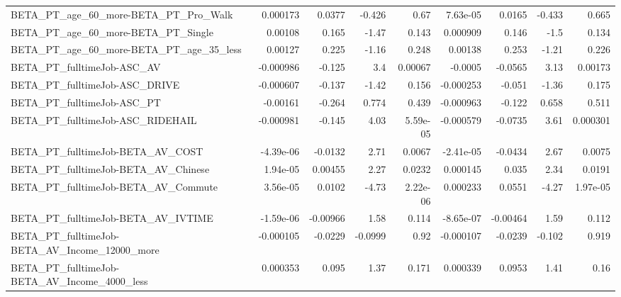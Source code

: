\begin{tabular}{lrrrrrrrr}
BETA\_PT\_age\_60\_more-BETA\_PT\_Pro\_Walk               &    0.000173 &       0.0377 &    -0.426 &     0.67 &   7.63e-05 &      0.0165 &       -0.433 &         0.665 \\
BETA\_PT\_age\_60\_more-BETA\_PT\_Single                 &     0.00108 &        0.165 &     -1.47 &    0.143 &   0.000909 &       0.146 &         -1.5 &         0.134 \\
BETA\_PT\_age\_60\_more-BETA\_PT\_age\_35\_less            &     0.00127 &        0.225 &     -1.16 &    0.248 &    0.00138 &       0.253 &        -1.21 &         0.226 \\
BETA\_PT\_fulltimeJob-ASC\_AV                         &   -0.000986 &       -0.125 &       3.4 &  0.00067 &    -0.0005 &     -0.0565 &         3.13 &       0.00173 \\
BETA\_PT\_fulltimeJob-ASC\_DRIVE                      &   -0.000607 &       -0.137 &     -1.42 &    0.156 &  -0.000253 &      -0.051 &        -1.36 &         0.175 \\
BETA\_PT\_fulltimeJob-ASC\_PT                         &    -0.00161 &       -0.264 &     0.774 &    0.439 &  -0.000963 &      -0.122 &        0.658 &         0.511 \\
BETA\_PT\_fulltimeJob-ASC\_RIDEHAIL                   &   -0.000981 &       -0.145 &      4.03 & 5.59e-05 &  -0.000579 &     -0.0735 &         3.61 &      0.000301 \\
BETA\_PT\_fulltimeJob-BETA\_AV\_COST                   &   -4.39e-06 &      -0.0132 &      2.71 &   0.0067 &  -2.41e-05 &     -0.0434 &         2.67 &        0.0075 \\
BETA\_PT\_fulltimeJob-BETA\_AV\_Chinese                &    1.94e-05 &      0.00455 &      2.27 &   0.0232 &   0.000145 &       0.035 &         2.34 &        0.0191 \\
BETA\_PT\_fulltimeJob-BETA\_AV\_Commute                &    3.56e-05 &       0.0102 &     -4.73 & 2.22e-06 &   0.000233 &      0.0551 &        -4.27 &      1.97e-05 \\
BETA\_PT\_fulltimeJob-BETA\_AV\_IVTIME                 &   -1.59e-06 &     -0.00966 &      1.58 &    0.114 &  -8.65e-07 &    -0.00464 &         1.59 &         0.112 \\
BETA\_PT\_fulltimeJob-BETA\_AV\_Income\_12000\_more      &   -0.000105 &      -0.0229 &   -0.0999 &     0.92 &  -0.000107 &     -0.0239 &       -0.102 &         0.919 \\
BETA\_PT\_fulltimeJob-BETA\_AV\_Income\_4000\_less       &    0.000353 &        0.095 &      1.37 &    0.171 &   0.000339 &      0.0953 &         1.41 &          0.16 \\

\end{tabular}
